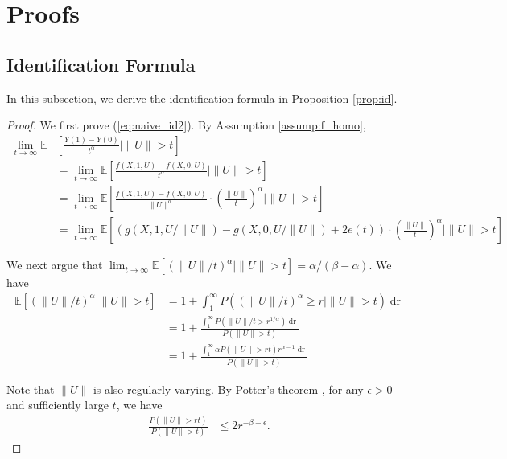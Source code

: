 \documentclass[12pt]{article}
\theoremstyle{plain}
\theoremstyle{definition}
\newcommand{\tmop}[1]{\ensuremath{\operatorname{#1}}}
\begin{document}
\newpage

\appendix
 

\section{Proofs}
\subsection{Identification Formula}
In this subsection, we derive the identification formula in Proposition
\ref{prop:id}.

\begin{proof}
We first prove (\ref{eq:naive_id2}). By Assumption \ref{assump:f_homo},
\begin{align*}
  \lim_{t \rightarrow \infty} \mathbb{E} &\left[ \frac{Y (1) - Y
  (0)}{t^{\alpha}} \mid \|U\|> t \right] \\
  & = \lim_{t \rightarrow \infty}
  \mathbb{E} \left[ \frac{f (X, 1, U) - f (X, 0, U)}{t^{\alpha}} \mid \|U\|> t
  \right] \\
  & = \lim_{t \rightarrow \infty} \mathbb{E} \left[ \frac{f (X, 1, U) - f (X,
  0, U)}{\|U\|^{\alpha}} \cdot \left( \frac{\|U\|}{t} \right)^{\alpha} \mid
  \|U\|> t \right]\\
  & = \lim_{t \rightarrow \infty} \mathbb{E} \left[ (g (X, 1, U / \| U \|) -
  g (X, 0, U / \| U \|) + 2 e (t)) \cdot \left( \frac{\|U\|}{t}
  \right)^{\alpha} \mid \|U\|> t \right]
\end{align*}

We next argue that $\lim_{t \rightarrow \infty} \mathbb{E} [(\| U \| /
t)^{\alpha} \mid \| U \| > t] = \alpha / (\beta - \alpha)$. We have
\begin{align*}
  \mathbb{E} [(\| U \| / t)^{\alpha} \mid \| U \| > t] & = 1 + \int^{\infty}_1
  P ((\| U \| / t)^{\alpha} \geqslant r \mid \| U \| > t) \tmop{dr}\\
  & = 1 + \frac{\int_1^{\infty} P (\| U \| / t > r^{1 / \alpha}) \tmop{dr}}{P
  (\| U \| > t)}\\
  & = 1 + \frac{\int_1^{\infty} \alpha P (\| U \| > {rt}) r^{\alpha - 1}
  \tmop{dr}}{P (\| U \| > t)}
\end{align*}

Note that $\| U \|$ is also regularly varying. By Potter's theorem \cite[Theorem 1.56]{bingham1989regular}, for any $\epsilon >0$ and sufficiently large $t$, we have
\begin{align*}
  \frac{P (\| U \| > {rt})}{P (\| U \| > t)} & \leqslant 2 r^{-\beta + \epsilon} .
\end{align*}


\end{proof}
\end{document}
